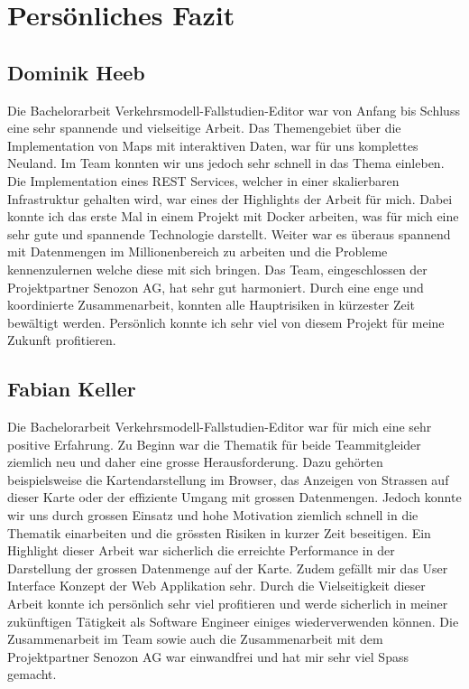 \section{Persönliches Fazit}
\subsection{Dominik Heeb}
Die Bachelorarbeit Verkehrsmodell-Fallstudien-Editor war von Anfang bis Schluss eine sehr spannende und vielseitige Arbeit. Das Themengebiet über die Implementation von Maps mit interaktiven Daten, war für uns komplettes Neuland. Im Team konnten wir uns jedoch sehr schnell in das Thema einleben. Die Implementation eines REST Services, welcher in einer skalierbaren Infrastruktur gehalten wird, war eines der Highlights der Arbeit für mich. Dabei konnte ich das erste Mal in einem Projekt mit Docker arbeiten, was für mich eine sehr gute und spannende Technologie darstellt. Weiter war es überaus spannend mit Datenmengen im Millionenbereich zu arbeiten und die Probleme kennenzulernen welche diese mit sich bringen. Das Team, eingeschlossen der Projektpartner Senozon AG, hat sehr gut harmoniert. Durch eine enge und koordinierte Zusammenarbeit, konnten alle Hauptrisiken in kürzester Zeit bewältigt werden.
Persönlich konnte ich sehr viel von diesem Projekt für meine Zukunft profitieren.
\subsection{Fabian Keller}
Die Bachelorarbeit \glqq{}Verkehrsmodell-Fallstudien-Editor\grqq{} war für mich eine sehr positive Erfahrung. Zu Beginn war die Thematik für beide Teammitgleider ziemlich neu und daher eine grosse Herausforderung. Dazu gehörten beispielsweise die Kartendarstellung im Browser, das Anzeigen von Strassen auf dieser Karte oder der effiziente Umgang mit grossen Datenmengen. Jedoch konnte wir uns durch grossen Einsatz und hohe Motivation ziemlich schnell in die Thematik einarbeiten und die grössten Risiken in kurzer Zeit beseitigen. Ein Highlight dieser Arbeit war sicherlich die erreichte Performance in der Darstellung der grossen Datenmenge auf der Karte. Zudem gefällt mir das User Interface Konzept der Web Applikation sehr. Durch die Vielseitigkeit dieser Arbeit konnte ich persönlich sehr viel profitieren und werde sicherlich in meiner zukünftigen Tätigkeit als Software Engineer einiges wiederverwenden können. Die Zusammenarbeit im Team sowie auch die Zusammenarbeit mit dem Projektpartner Senozon AG war einwandfrei und hat mir sehr viel Spass gemacht.